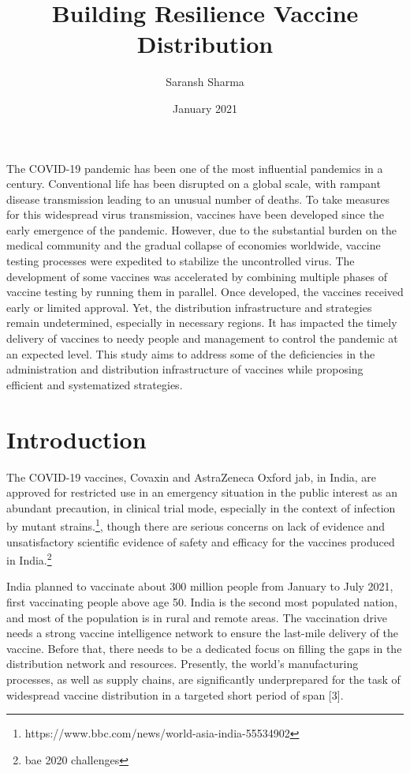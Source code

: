 \documentclass{article}
\begin{document}
\title{Building Resilience Vaccine Distribution}
\author{Saransh Sharma }
\date{January 2021}


\maketitle


\abstract

The COVID-19 pandemic has been one of the most inﬂuential pandemics in a century. Conventional life has been disrupted on a global scale, with rampant disease transmission leading to an unusual number of deaths. To take measures for this widespread virus transmission, vaccines have been developed since the early emergence of the pandemic. However, due to the substantial burden on the medical community and the gradual collapse of economies worldwide, vaccine testing processes were expedited to stabilize the uncontrolled virus. The development of some vaccines was accelerated by combining multiple phases of vaccine testing by running them in parallel. Once developed, the vaccines received early or limited approval. Yet, the distribution infrastructure and strategies remain undetermined, especially in necessary regions. It has impacted the timely delivery of vaccines to needy people and management to control the pandemic at an expected level. This study aims to address some of the deﬁciencies in the administration and distribution infrastructure of vaccines while proposing eﬃcient and systematized strategies.

\section{Introduction}

The COVID-19 vaccines, Covaxin and AstraZeneca Oxford jab, in India, are approved for restricted use in an emergency situation in the public interest as an abundant precaution, in clinical trial mode, especially in the context of infection by mutant strains.\footnote{https://www.bbc.com/news/world-asia-india-55534902}, though there are serious concerns on lack of evidence and unsatisfactory scientific evidence of safety and efficacy for the vaccines produced in India.\footnote{bae 2020 challenges} 

India planned to vaccinate about 300 million people from January to July 2021, first vaccinating people above age 50. India is the second most populated nation, and most of the population is in rural and remote areas. The vaccination drive needs a strong vaccine intelligence network to ensure the last-mile delivery of the vaccine. Before that, there needs to be a dedicated focus on filling the gaps in the distribution network and resources. Presently, the world’s manufacturing processes, as well as supply chains, are significantly underprepared for the task of widespread vaccine distribution in a targeted short period of span [3]. 
\end{document}
